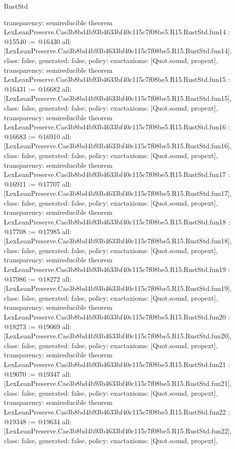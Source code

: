 \begin{lexlean}{RustStd}
\begin{coremodule}
{  transparency: semireducible
}
theorem LexLeanPreserve.Cae3b8bd4b93b4633bf40c115c7f08be5.R15.RustStd.fun14 : @15540 := @16430 {
  all: [LexLeanPreserve.Cae3b8bd4b93b4633bf40c115c7f08be5.R15.RustStd.fun14],
  class: false,
  generated: false,
  policy: exact{axioms: [Quot.sound, propext]},
  transparency: semireducible
}
theorem LexLeanPreserve.Cae3b8bd4b93b4633bf40c115c7f08be5.R15.RustStd.fun15 : @16431 := @16682 {
  all: [LexLeanPreserve.Cae3b8bd4b93b4633bf40c115c7f08be5.R15.RustStd.fun15],
  class: false,
  generated: false,
  policy: exact{axioms: [Quot.sound, propext]},
  transparency: semireducible
}
theorem LexLeanPreserve.Cae3b8bd4b93b4633bf40c115c7f08be5.R15.RustStd.fun16 : @16683 := @16910 {
  all: [LexLeanPreserve.Cae3b8bd4b93b4633bf40c115c7f08be5.R15.RustStd.fun16],
  class: false,
  generated: false,
  policy: exact{axioms: [Quot.sound, propext]},
  transparency: semireducible
}
theorem LexLeanPreserve.Cae3b8bd4b93b4633bf40c115c7f08be5.R15.RustStd.fun17 : @16911 := @17707 {
  all: [LexLeanPreserve.Cae3b8bd4b93b4633bf40c115c7f08be5.R15.RustStd.fun17],
  class: false,
  generated: false,
  policy: exact{axioms: [Quot.sound, propext]},
  transparency: semireducible
}
theorem LexLeanPreserve.Cae3b8bd4b93b4633bf40c115c7f08be5.R15.RustStd.fun18 : @17708 := @17985 {
  all: [LexLeanPreserve.Cae3b8bd4b93b4633bf40c115c7f08be5.R15.RustStd.fun18],
  class: false,
  generated: false,
  policy: exact{axioms: [Quot.sound, propext]},
  transparency: semireducible
}
theorem LexLeanPreserve.Cae3b8bd4b93b4633bf40c115c7f08be5.R15.RustStd.fun19 : @17986 := @18272 {
  all: [LexLeanPreserve.Cae3b8bd4b93b4633bf40c115c7f08be5.R15.RustStd.fun19],
  class: false,
  generated: false,
  policy: exact{axioms: [Quot.sound, propext]},
  transparency: semireducible
}
theorem LexLeanPreserve.Cae3b8bd4b93b4633bf40c115c7f08be5.R15.RustStd.fun20 : @18273 := @19069 {
  all: [LexLeanPreserve.Cae3b8bd4b93b4633bf40c115c7f08be5.R15.RustStd.fun20],
  class: false,
  generated: false,
  policy: exact{axioms: [Quot.sound, propext]},
  transparency: semireducible
}
theorem LexLeanPreserve.Cae3b8bd4b93b4633bf40c115c7f08be5.R15.RustStd.fun21 : @19070 := @19347 {
  all: [LexLeanPreserve.Cae3b8bd4b93b4633bf40c115c7f08be5.R15.RustStd.fun21],
  class: false,
  generated: false,
  policy: exact{axioms: [Quot.sound, propext]},
  transparency: semireducible
}
theorem LexLeanPreserve.Cae3b8bd4b93b4633bf40c115c7f08be5.R15.RustStd.fun22 : @19348 := @19634 {
  all: [LexLeanPreserve.Cae3b8bd4b93b4633bf40c115c7f08be5.R15.RustStd.fun22],
  class: false,
  generated: false,
  policy: exact{axioms: [Quot.sound, propext]},
}
\end{coremodule}
\end{lexlean}
